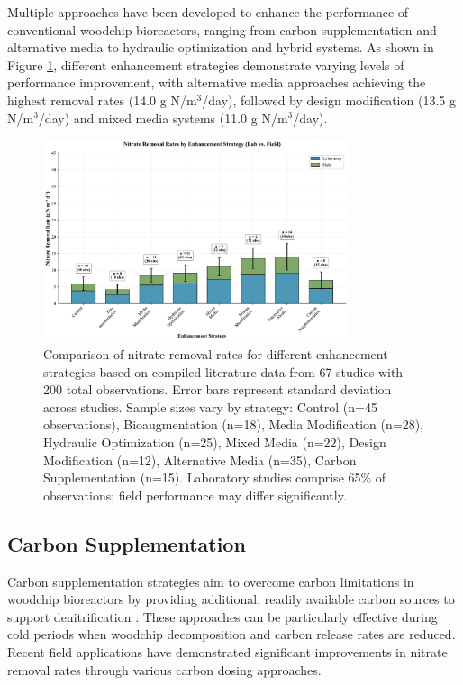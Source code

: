 \documentclass[12pt,a4paper]{article}
\begin{document}
Multiple approaches have been developed to enhance the performance of conventional woodchip bioreactors, ranging from carbon supplementation and alternative media to hydraulic optimization and hybrid systems. As shown in Figure \ref{fig:removal_rates_by_strategy}, different enhancement strategies demonstrate varying levels of performance improvement, with alternative media approaches achieving the highest removal rates (14.0 g N/m$^3$/day), followed by design modification (13.5 g N/m$^3$/day) and mixed media systems (11.0 g N/m$^3$/day).

\begin{figure}[H]
\centering
\includegraphics[width=0.8\textwidth]{fig1_removal_rates_scientific}
\caption{Comparison of nitrate removal rates for different enhancement strategies based on compiled literature data from 67 studies with 200 total observations. Error bars represent standard deviation across studies. Sample sizes vary by strategy: Control (n=45 observations), Bioaugmentation (n=18), Media Modification (n=28), Hydraulic Optimization (n=25), Mixed Media (n=22), Design Modification (n=12), Alternative Media (n=35), Carbon Supplementation (n=15). Laboratory studies comprise 65\% of observations; field performance may differ significantly.}
\label{fig:removal_rates_by_strategy}
\end{figure}

\subsection{Carbon Supplementation}

Carbon supplementation strategies aim to overcome carbon limitations in woodchip bioreactors by providing additional, readily available carbon sources to support denitrification \citep{RN635, RN632}. These approaches can be particularly effective during cold periods when woodchip decomposition and carbon release rates are reduced. Recent field applications have demonstrated significant improvements in nitrate removal rates through various carbon dosing approaches.
\end{document}
